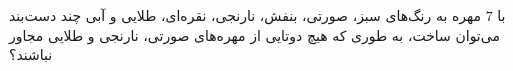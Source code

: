 \p
با 
$7$
 مهره به رنگ‌ها‌ی سبز، صورتی، بنفش، نارنجی، نقره‌ای، طلایی و آبی چند دست‌بند می‌توان ساخت، به طوری که هیچ دوتایی از مهره‌های صورتی، نارنجی و طلایی مجاور نباشند؟